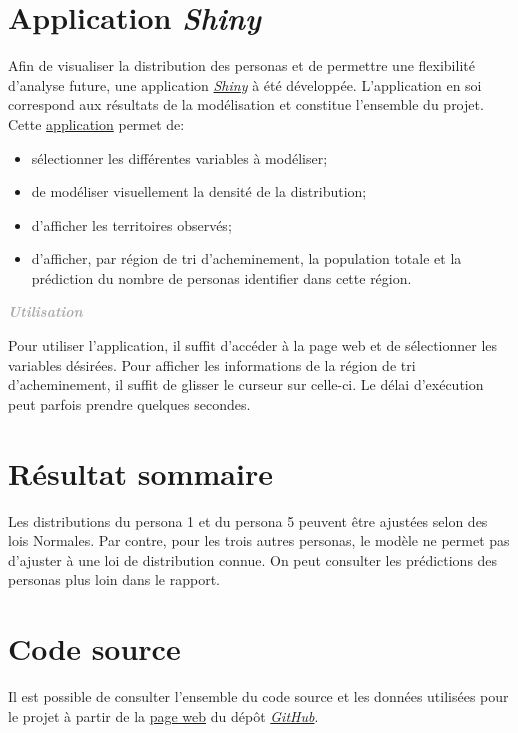 \documentclass[11pt,french]{article}\usepackage[]{graphicx}\usepackage[]{color}
\newenvironment{moreInfo}[1]
	{\begin{mdframed}
	\textcolor{darkgray}{\huge \raisebox{-3.5pt}{\faInfo} 
	\hspace{0.5cm} \large\bfseries #1}\\[5pt]
	\normalsize
	\makebox[0.1\textwidth][l]{}	
	\begin{minipage}{10cm}}
	{	\end{minipage}
	\end{mdframed}}
\begin{document}
\section{Application \emph{Shiny}}

Afin de visualiser la distribution des personas et de permettre une flexibilité d'analyse future, une application \href{https://www.rstudio.com/products/shiny/}{\emph{Shiny}} à été développée. L'application en soi correspond aux résultats de la modélisation et constitue l'ensemble du projet. Cette \href{https://davebulaval.shinyapps.io/personnasIdentificateur/}{application} permet de:
\begin{itemize}
\item sélectionner les différentes variables à modéliser;
\item de modéliser visuellement la densité de la distribution;
\item d'afficher les territoires observés;
\item d'afficher, par région de tri d'acheminement, la population totale et la prédiction du nombre de personas identifier dans cette région.
\end{itemize}

\begin{moreInfo}{\color{Gray}\emph{Utilisation}
     \color{black}}
Pour utiliser l'application, il suffit d'accéder à la page web et de sélectionner les variables désirées. Pour afficher les informations de la région de tri d'acheminement, il suffit de glisser le curseur sur celle-ci.
     \newline
     Le délai d'exécution peut parfois prendre quelques secondes. 
\end{moreInfo}

\section{Résultat sommaire}

Les distributions du persona 1 et du persona 5 peuvent être ajustées selon des lois Normales. Par contre, pour les trois autres personas, le modèle ne permet pas d'ajuster à une loi de distribution connue. On peut consulter les prédictions des personas plus loin dans le rapport.

\section{Code source}

Il est possible de consulter l'ensemble du code source et les données utilisées pour le projet à partir de la \href{https://davebulaval.github.io/Actulab_COOP/}{page web} du dépôt \href{https://github.com/davebulaval/Actulab_COOP}{\emph{GitHub}}.
\end{document}
